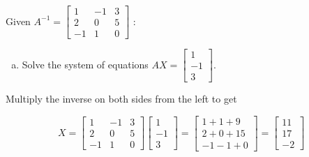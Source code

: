 \documentclass[../main.tex]{subfiles}
\begin{document}
Given
$A^{-1} = 
\left[\begin{array}{rrr}
	1 & -1 & 3 \\
	2 & 0 & 5 \\
	-1 & 1 & 0
\end{array}\right]$
:
\begin{enumerate}[a)]
	\item Solve the system of equations
		$
			AX =
			\left[\begin{array}{rrr}
				1 \\
				-1 \\
				3
			\end{array}\right]
		$.
\end{enumerate}

\solution

Multiply the inverse on both sides from the left to get

\[
    X = 
        \left[\begin{array}{rrr}
            1 & -1 & 3 \\
            2 & 0 & 5 \\
            -1 & 1 & 0
        \end{array}\right]
        \left[\begin{array}{rrr}
            1 \\
            -1 \\
            3
        \end{array}\right]
    =
        \left[\begin{array}{r}
            1+1+9\\
            2+0+15\\
            -1-1+0
        \end{array}\right]
    =
        \left[\begin{array}{r}
            11\\
            17\\
            -2
        \end{array}\right]
    \]
\end{document}

